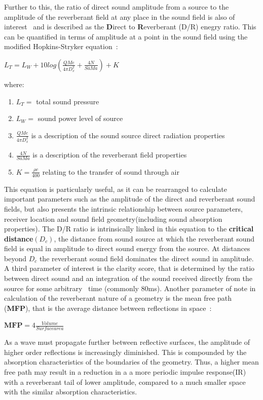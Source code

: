 \documentclass[paper=a4, fontsize=10pt, font=arial]{scrartcl} %
\numberwithin{equation}{section} %
\numberwithin{figure}{section} %
\numberwithin{table}{section} %
\begin{document}
Further to this, the ratio of direct sound amplitude from a source to the amplitude of the reverberant field at any place in the sound field is also of interest~\cite{Begault1995} and is described as the \textbf{D}irect to \textbf{R}everberant (D/R) enegry ratio. This can be quantified in terms of amplitude at a point in the sound field using the modified Hopkins-Stryker equation~\cite{davis2006sound}:\\ 
\begin{center}
$L_T = L_W + 10 log \left( \frac{QMe}{4\pi D_{x}^2} + \frac{4N}{S \overline{a} M a}\right) + K $\\
\end{center}
where:
\begin{enumerate}
\item $L_T =$ total sound pressure
\item $L_W =$ sound power level of source
\item $\frac{QMe}{4\pi D_{x}^2}$ is a description of the sound source direct radiation properties
\item $\frac{4N}{S \overline{a} M a}$ is a description of the reverberant field properties
\item $K = \frac{\rho \textit{c}}{400}$ relating to the transfer of sound through air
\end{enumerate}

This equation is particularly useful, as it can be rearranged to calculate important parameters such as the amplitude of the direct and reverberant sound fields, but also presents the intrinsic relationship between source parameters, receiver location and sound field geometry(including sound absorption properties).
The D/R ratio is intrinsically linked in this equation to the \textbf{critical distance}$(D_c)$, the distance from sound source at which the reverberant sound field is equal in amplitude to direct sound energy from the source. At distances beyond $D_c$ the reverberant sound field dominates the direct sound in amplitude.
A third parameter of interest is the clarity score, that is determined by the ratio between direct sound and an integration of the sound received directly from the source for some arbitrary~\cite{Begault1995} time (commonly 80ms). 
Another parameter of note in calculation of the reverberant nature of a geometry is the mean free path (\textbf{MFP}), that is the average distance between reflections in space~\cite{davis2006sound}:
\begin{center}
$ \textbf{MFP} = 4 \frac{Volume}{Surface area}$
\end{center}
As a wave must propagate further between reflective surfaces, the amplitude of higher order reflections is increasingly diminished. This is compounded by the absorption characteristics of the boundaries of the geometry. Thus, a higher mean free path may result in a reduction in a a more periodic impulse response(IR) with a reverberant tail of lower amplitude, compared to a much smaller space with the similar absorption characteristics.
\end{document}
